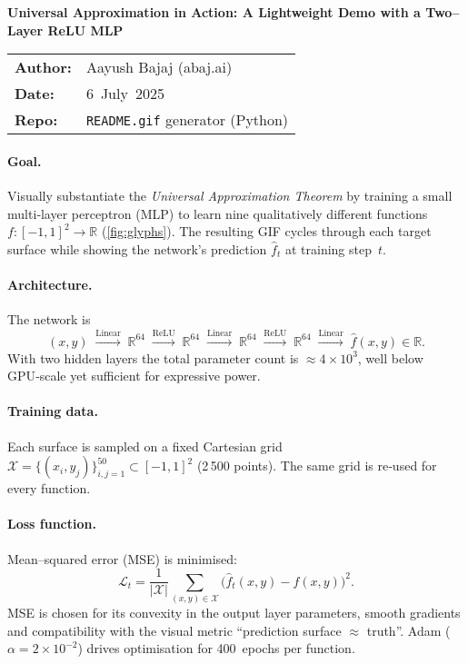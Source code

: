 \documentclass[11pt]{article}
\begin{document}
\begin{center}
    \Large\bfseries Universal Approximation in Action:\newline
    A Lightweight Demo with a Two–Layer ReLU MLP
\end{center}
\vspace{-0.5em}
\begin{tabular}{@{}ll@{}}
 \textbf{Author:} & Aayush Bajaj (abaj.ai) \\
 \textbf{Date:}   & 6~July~2025 \\
 \textbf{Repo:}   & \texttt{README.gif} generator (Python) \\
\end{tabular}
\vspace{0.7em}

\paragraph{Goal.} Visually substantiate the \emph{Universal Approximation Theorem} by training a
small multi‑layer perceptron (MLP) to learn nine qualitatively different
functions $f: [-1,1]^2 \to \mathbb R$ (\autoref{fig:glyphs}). The resulting GIF cycles through each
target surface while showing the network’s prediction $\widehat f_t$ at training
step~$t$.

\paragraph{Architecture.} The network is
\[
    (x,y)\;\stackrel{\text{Linear}}{\longrightarrow}\; \mathbb R^{64}
    \;\xrightarrow{\text{ReLU}}\; \mathbb R^{64}
    \;\stackrel{\text{Linear}}{\longrightarrow}\; \mathbb R^{64}
    \;\xrightarrow{\text{ReLU}}\; \mathbb R^{64}
    \;\stackrel{\text{Linear}}{\longrightarrow}\; \widehat f(x,y)\in\mathbb R.
\]
With two hidden layers the total parameter count is \(\approx\!4\times10^3\), well below
GPU‑scale yet sufficient for expressive power.

\paragraph{Training data.} Each surface is sampled on a fixed Cartesian grid
\(\mathcal X=\{(x_i,y_j)\}_{i,j=1}^{50}\subset[-1,1]^2\) (2\,500 points). The same grid is
re‑used for every function.

\paragraph{Loss function.} Mean–squared error (MSE) is minimised:
\begin{equation}
    \mathcal L_t
    = \frac1{|\mathcal X|} \sum_{(x,y)\in\mathcal X}
        \bigl( \widehat f_t(x,y) - f(x,y) \bigr)^2.
\end{equation}
MSE is chosen for its convexity in the output layer parameters, smooth gradients and
compatibility with the visual metric “prediction surface $\approx$ truth”. Adam
(\(\alpha=2\times10^{-2}\)) drives optimisation for 400~epochs per function.
\end{document}
